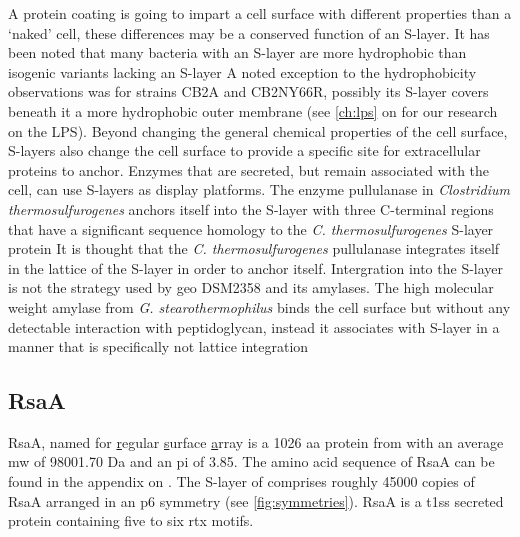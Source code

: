 A protein coating is going to impart a cell surface with different properties than a `naked' cell, these differences may be a conserved function of an \ac{S-layer}.
 It has been noted that many bacteria with an \ac{S-layer} are more hydrophobic than isogenic variants lacking an \ac{S-layer} A noted exception to the hydrophobicity observations was for \caulobacter strains CB2A and CB2NY66R, possibly its \ac{S-layer} covers beneath it a more hydrophobic outer membrane (see \cref{ch:lps} on  for our research on the \caulobacter \ac{LPS}). Beyond changing the general chemical properties of the cell surface, \acp{S-layer} also change the cell surface to provide a specific site for extracellular proteins to anchor. Enzymes that are secreted, but remain associated with the cell, can use \acp{S-layer} as display platforms. The enzyme pullulanase in \textit{Clostridium thermosulfurogenes} anchors itself into the \ac{S-layer} with three C-terminal regions that have a significant sequence homology to the \textit{C. thermosulfurogenes} \ac{S-layer} protein It is thought that the \textit{C. thermosulfurogenes} pullulanase integrates itself in the lattice of the \ac{S-layer} in order to anchor itself. Intergration into the \ac{S-layer} is not the strategy used by \ac{geo} DSM2358 and its amylases. The high molecular weight amylase from \textit{G. stearothermophilus} binds the cell surface but without any detectable interaction with peptidoglycan, instead it associates with \ac{S-layer} in a manner that is specifically not lattice integration


\subsection{RsaA} \label{sec:intro-rsaa}

RsaA, named for \underline{r}egular \underline{s}urface \underline{a}rray is a 1026 \ac{aa} protein from \caulobacter with an average \ac{mw} of 98001.70 Da and an \ac{pi} of 3.85. The amino acid sequence of RsaA can be found in the appendix on . The \ac{S-layer} of \caulobacter comprises roughly 45000 copies of RsaA arranged in an p6 symmetry (see \cref{fig:symmetries}). RsaA is a \ac{t1ss} secreted protein containing five to six \ac{rtx} motifs.


